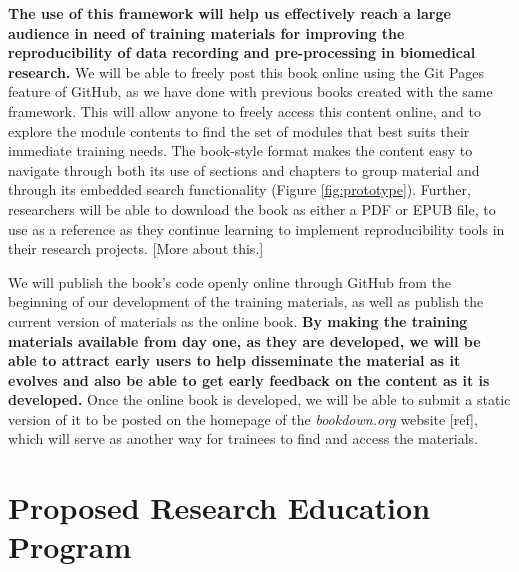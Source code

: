 \documentclass[pdftex,english,11pt,parskip=half]{scrartcl}
\begin{document}
\textbf{The use of this framework will help us effectively reach a large audience in need of training materials for improving the reproducibility of data recording and pre-processing in biomedical research.} We will be able to freely post this book online using the Git Pages feature of GitHub, as we have done with previous books created with the same framework. This will allow anyone to freely access this content online, and to explore the module contents to find the set of modules that best suits their immediate training needs. The book-style format makes the content easy to navigate through both its use of sections and chapters to group material and through its embedded search functionality (Figure \ref{fig:prototype}). Further, researchers will be able to download the book as either a PDF or EPUB file, to use as a reference as they continue learning to implement reproducibility tools in their research projects. [More about this.]

We will publish the book's code openly online through GitHub from the beginning of our development of the training materials, as well as publish the current version of materials as the online book. \textbf{By making the training materials available from day one, as they are developed, we will be able to attract early users to help disseminate the material as it evolves and also be able to get early feedback on the content as it is developed.} Once the online book is developed, we will be able to submit a static version of it to be posted on the homepage of the \textit{bookdown.org} website [ref], which will serve as another way for trainees to find and access the materials.

\section{Proposed Research Education Program}
\end{document}
